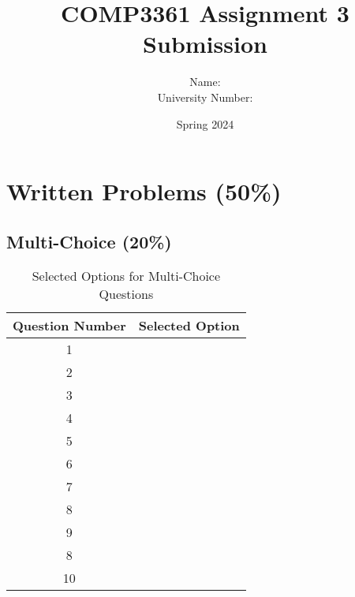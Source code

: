 \documentclass[10pt]{article}
\begin{document}
\title{COMP3361 Assignment 3 Submission}
\author{Name: \\ University Number:}
\date{Spring 2024}
\maketitle

\section{Written Problems (50\%)}

\subsection{Multi-Choice (20\%)}

\begin{table}[htbp]
\centering
\begin{tabular}{@{}cc@{}}
\toprule
Question Number & Selected Option \\ \midrule
1               &              \\
2               &              \\
3               &              \\
4               &              \\
5               &              \\
6               &              \\
7               &              \\
8               &              \\
9               &              \\
8               &              \\
10              &              \\
\bottomrule
\end{tabular}
\caption{Selected Options for Multi-Choice Questions}
\label{tab:my_label}
\end{table}
\end{document}
